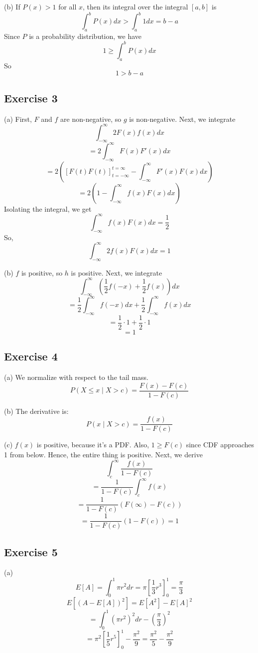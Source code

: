 \documentclass{book}
\begin{document}
\noindent
(b) If $P(x) > 1$ for all $x$, then its integral over the integral $[a, b]$ is
$$\int_a^b P(x) dx > \int_a^b 1 dx = b - a$$
Since $P$ is a probability distribution, we have
$$1 \geq \int_a^b P(x) dx$$
So
$$1 > b - a$$

\subsection*{Exercise 3}
(a) First, $F$ and $f$ are non-negative, so $g$ is non-negative. Next, we integrate
$$\int_{-\infty}^\infty 2F(x)f(x) dx$$
$$= 2\int_{-\infty}^\infty F(x)F'(x) dx$$
$$= 2 \left( \left[F(t) F(t)\right]_{t = -\infty}^{t = \infty} - \int_{-\infty}^\infty F'(x)F(x) dx \right)$$
$$= 2 \left( 1 - \int_{-\infty}^\infty f(x)F(x) dx \right)$$
Isolating the integral, we get
$$\int_{-\infty}^\infty f(x)F(x) dx = \frac{1}{2}$$
So,
$$\int_{-\infty}^\infty 2f(x)F(x) dx = 1$$

\noindent
(b) $f$ is positive, so $h$ is positive. Next, we integrate
$$\int_{-\infty}^\infty \left( \frac{1}{2}f(-x) + \frac{1}{2} f(x) \right) dx$$
$$= \frac{1}{2} \int_{-\infty}^\infty f(-x) dx + \frac{1}{2} \int_{-\infty}^\infty f(x) dx$$
$$= \frac{1}{2} \cdot 1 + \frac{1}{2} \cdot 1$$
$$= 1$$

\subsection*{Exercise 4}
(a)
We normalize with respect to the tail mass.
$$P(X \leq x \mid X > c) = \frac{F(x) - F(c)}{1 - F(c)}$$

\noindent
(b)
The derivative is:
$$P(x \mid X > c) = \frac{f(x)}{1 - F(c)}$$

\noindent
(c)
$f(x)$ is positive, because it's a PDF. Also, $1 \geq F(c)$ since CDF approaches 1 from below. Hence, the entire thing is positive. Next, we derive
$$\int_c^\infty \frac{f(x)}{1 - F(c)}$$
$$= \frac{1}{1 - F(c)} \int_c^\infty f(x)$$
$$= \frac{1}{1 - F(c)} (F(\infty) - F(c))$$
$$= \frac{1}{1 - F(c)} (1 - F(c)) = 1$$

\subsection*{Exercise 5}
(a)
$$E[A] = \int_0^1 \pi r^2 dr = \pi \left[ \frac{1}{3} r^3 \right]_0^1 = \frac{\pi}{3}$$
$$E[(A - E[A])^2] = E[A^2] - E[A]^2$$
$$= \int_0^1 (\pi r^2)^2 dr - \left(\frac{\pi}{3}\right)^2$$
$$= \pi^2 \left[ \frac{1}{5} r^5 \right]_0^1 - \frac{\pi^2}{9} = \frac{\pi^2}{5} - \frac{\pi^2}{9}$$
\end{document}

